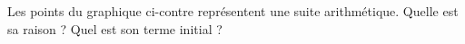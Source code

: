 
\begin{exercice}\label{exosmath-0165}

    \begin{multicols}{2}
    Les points du graphique ci-contre représentent une suite arithmétique. Quelle est sa raison ? Quel est son terme initial ?


    \columnbreak



    \begin{center}

    \end{center}

    \end{multicols}

    
\end{exercice}
